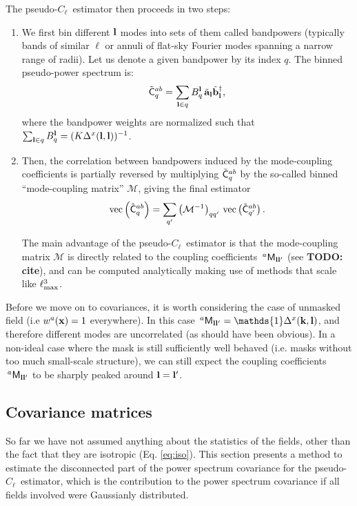 \documentclass[a4paper,11pt]{article}
\newcommand{\todo}[1]{{\bf TODO: #1}}
\newcommand{\PCL}{pseudo-$C_\ell$~}
\begin{document}
    The \PCL estimator then proceeds in two steps:
    \begin{enumerate}
      \item We first bin different ${\bf l}$ modes into sets of them called bandpowers (typically bands of similar $\ell$ or annuli of flat-sky Fourier modes spanning a narrow range of radii). Let us denote a given bandpower by its index $q$. The binned pseudo-power spectrum is:
      \begin{equation}
        \tilde{\sf C}^{ab}_q=\sum_{{\bf l}\in q} B_q^{\bf l}\,\tilde{\bf a}_{\bf l}\tilde{\bf b}^\dag_{\bf l},
      \end{equation}
      where the bandpower weights are normalized such that $\sum_{{\bf l}\in q}B_q^{\bf l}=(K\Delta^x({\bf l},{\bf l}))^{-1}$.
      \item Then, the correlation between bandpowers induced by the mode-coupling coefficients is partially reversed by multiplying $\tilde{\sf C}^{ab}_q$ by the so-called binned ``mode-coupling matrix'' $\mathcal{M}$, giving the final estimator
      \begin{equation}
        {\rm vec}\left(\hat{\sf C}^{ab}_q\right) = \sum_{q'} \left(\mathcal{M}^{-1}\right)_{qq'}\,{\rm vec}\left(\tilde{\sf C}^{ab}_{q'}\right).
      \end{equation}

      The main advantage of the \PCL estimator is that the mode-coupling matrix $\mathcal{M}$ is directly related to the coupling coefficients $\,^a{\sf M}_{{\bf l}{\bf l}'}$ (see \todo{cite}), and can be computed analytically making use of methods that scale like $\ell_{\rm max}^3$.
    \end{enumerate}

    Before we move on to covariances, it is worth considering the case of unmasked field (i.e $w^a({\bf x})=1$ everywhere). In this case $\,^a{\sf M}_{{\bf l}{\bf l}'}=\mathds{1}\Delta^x({\bf k},{\bf l})$, and therefore different modes are uncorrelated (as should have been obvious). In a non-ideal case where the mask is still sufficiently well behaved (i.e. masks without too much small-scale structure), we can still expect the coupling coefficients $\,^a{\sf M}_{{\bf l}{\bf l}'}$ to be sharply peaked around ${\bf l}={\bf l}'$.
  
  \subsection{Covariance matrices}
    So far we have not assumed anything about the statistics of the fields, other than the fact that they are isotropic (Eq. \ref{eq:iso}). This section presents a method to estimate the disconnected part of the power spectrum covariance for the \PCL estimator, which is the contribution to the power spectrum covariance if all fields involved were Gaussianly distributed.
    
\end{document}
